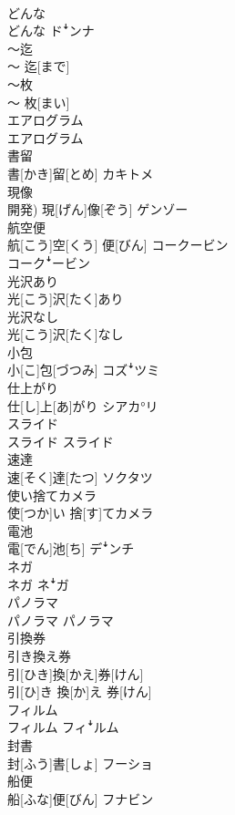 \documentclass[8pt]{extreport}
\begin{document}
\begin{CJK}{UTF8}{min}
\\	どんな	
\\	どんな	ドꜜンナ
\\	〜迄	
\\	〜 迄[まで]	
\\	〜枚	
\\	〜 枚[まい]	
\\	エアログラム	
\\	エアログラム	
\\	書留	
\\	書[かき]留[とめ]	カキトメ
\\	現像	
\\	開発)	現[げん]像[ぞう]	ゲンゾー
\\	航空便	
\\	航[こう]空[くう] 便[びん]	コークービン 
\\	コークꜜービン
\\	光沢あり	
\\	光[こう]沢[たく]あり	
\\	光沢なし	
\\	光[こう]沢[たく]なし	
\\	小包	
\\	小[こ]包[づつみ]	コズꜜツミ
\\	仕上がり	
\\	仕[し]上[あ]がり	シアカ°リ
\\	スライド	
\\	スライド	スライド
\\	速達	
\\	速[そく]達[たつ]	ソクタツ
\\	使い捨てカメラ	
\\	使[つか]い 捨[す]てカメラ	
\\	電池	
\\	電[でん]池[ち]	デꜜンチ
\\	ネガ	
\\	ネガ	ネꜜガ
\\	パノラマ	
\\	パノラマ	パノラマ
\\	引換券 
\\	引き換え券	
\\	引[ひき]換[かえ]券[けん] 
\\	引[ひ]き 換[か]え 券[けん]	
\\	フィルム	
\\	フィルム	フィꜜルム
\\	封書	
\\	封[ふう]書[しょ]	フーショ
\\	船便	
\\	船[ふな]便[びん]	フナビン 

\end{CJK}
\end{document}
